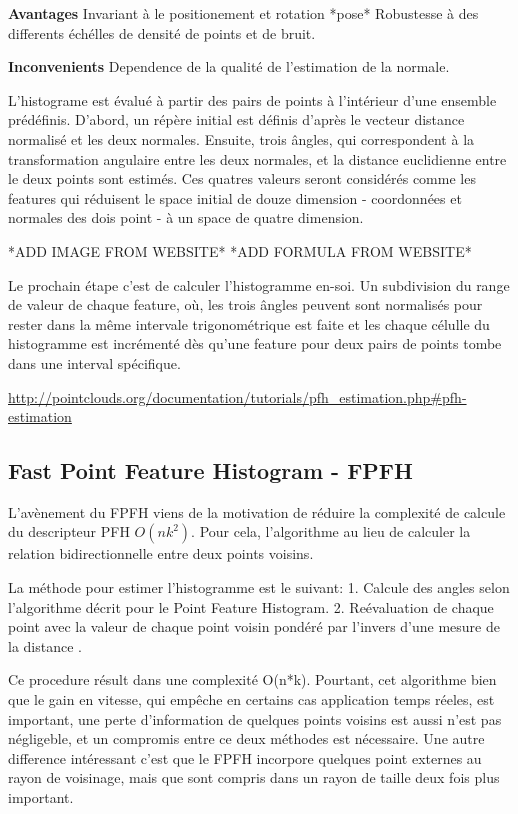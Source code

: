 \textbf{Avantages}
Invariant à le positionement et rotation *pose*
Robustesse à des differents échélles de densité de points et de bruit.

\textbf{Inconvenients}
Dependence de la qualité de l'estimation de la normale.


L'histograme est évalué à partir des pairs de points à l'intérieur d'une ensemble prédéfinis. D'abord, un répère initial est définis d'après le vecteur distance normalisé et les deux normales. Ensuite, trois ângles, qui correspondent à la transformation angulaire entre les deux normales, et la distance euclidienne entre le deux points sont estimés. Ces quatres valeurs seront considérés comme les features qui réduisent le space initial de douze dimension - coordonnées et normales des dois point - à un space de quatre dimension.

*ADD IMAGE FROM WEBSITE*
*ADD FORMULA FROM WEBSITE*


Le prochain étape c'est de calculer l'histogramme en-soi. Un subdivision du range de valeur de chaque feature, où, les trois ângles peuvent sont normalisés pour rester dans la même intervale trigonométrique est faite et les chaque célulle du histogramme est incrémenté dès qu'une feature pour deux pairs de points tombe dans une interval spécifique. 

\url{http://pointclouds.org/documentation/tutorials/pfh_estimation.php#pfh-estimation}

\subsection{Fast Point Feature Histogram - FPFH}

L'avènement du FPFH viens de la motivation de réduire la complexité de calcule du descripteur PFH $ O(nk^2) $. Pour cela, l'algorithme au lieu de calculer la relation bidirectionnelle entre deux points voisins.

La méthode pour estimer l'histogramme est le suivant:
1. Calcule des angles selon l'algorithme décrit pour le Point Feature Histogram.
2. Reévaluation de chaque point avec la valeur de chaque point voisin pondéré par l'invers d'une mesure de la distance .

Ce procedure résult dans une complexité O(n*k). Pourtant, cet algorithme bien que le gain en vitesse, qui empêche en certains cas application temps réeles, est important, une perte d'information de quelques points voisins est aussi n'est pas négligeble, et un compromis entre ce deux méthodes est nécessaire. Une autre difference intéressant c'est que le FPFH incorpore quelques point externes au rayon de voisinage, mais que sont compris dans un rayon de taille deux fois plus important.

